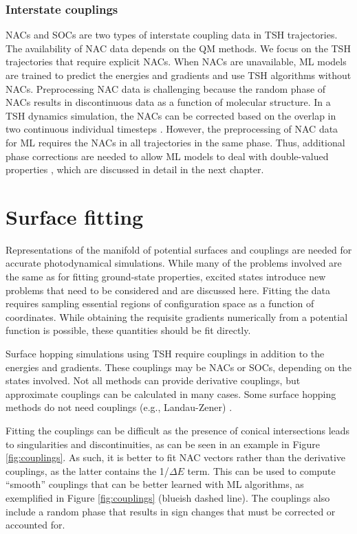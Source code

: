 \documentclass[9pt,bestpractices]{livecoms}
\begin{document}
\subsubsection{Interstate couplings}
\label{sec:couplings}

NACs and SOCs are two types of interstate coupling data in TSH trajectories. The availability of NAC data depends on the QM methods. We focus on the TSH trajectories that require explicit NACs. When NACs are unavailable, ML models are trained to predict the energies and gradients and use TSH algorithms without NACs. Preprocessing NAC data is challenging because the random phase of NACs results in discontinuous data as a function of molecular structure. In a TSH dynamics simulation, the NACs can be corrected based on the overlap in two continuous individual timesteps \cite{RN132}. However, the preprocessing of NAC data for ML requires the NACs in all trajectories in the same phase. Thus, additional phase corrections are needed to allow ML models to deal with double-valued properties \cite{RN103, RN41}, which are discussed in detail in the next chapter. 

\section{Surface fitting}
\label{sec:fitting}

Representations of the manifold of potential surfaces and couplings are needed for accurate photodynamical simulations. While many of the problems involved are the same as for fitting ground-state properties, excited states introduce new problems that need to be considered and are discussed here. Fitting the data requires sampling essential regions of configuration space as a function of coordinates. While obtaining the requisite gradients numerically from a potential function is possible, these quantities should be fit directly.

Surface hopping simulations using TSH require couplings in addition to the energies and gradients. These couplings may be NACs or SOCs, depending on the states involved. Not all methods can provide derivative couplings, but approximate couplings can be calculated in many cases.  Some surface hopping methods do not need couplings (e.g., Landau-Zener) \cite{RN77}.

Fitting the couplings can be difficult as the presence of conical intersections leads to singularities and discontinuities, as can be seen in an example in Figure \ref{fig:couplings}. As such, it is better to fit NAC vectors rather than the derivative couplings, as the latter contains the 1/$\Delta E$ term. This can be used to compute “smooth” couplings \cite{RN103} that can be better learned with ML algorithms, as exemplified in Figure \ref{fig:couplings} (blueish dashed line). The couplings also include a random phase that results in sign changes that must be corrected or accounted for.
\end{document}
